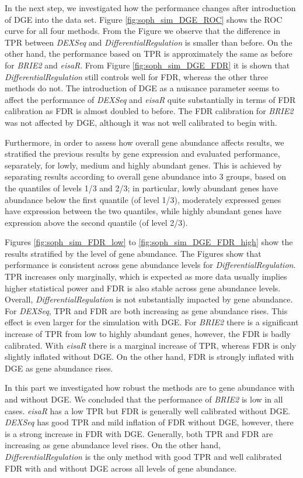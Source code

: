 In the next step, we investigated how the performance changes after introduction of DGE into the data set. Figure \ref{fig:soph_sim_DGE_ROC} shows the ROC curve for all four methods. From the Figure we observe that the difference in TPR between \emph{DEXSeq} and \emph{DifferentialRegulation} is smaller than before. On the other hand, the performance based on TPR is approximately the same as before for \emph{BRIE2} and \emph{eisaR}. From Figure \ref{fig:soph_sim_DGE_FDR} it is shown that \emph{DifferentialRegulation} still controls well for FDR, whereas the other three methods do not. The introduction of DGE as a nuisance parameter seems to affect the performance of \emph{DEXSeq} and \emph{eisaR} quite substantially in terms of FDR calibration as FDR is almost doubled to before. The FDR calibration for \emph{BRIE2} was not affected by DGE, although it was not well calibrated to begin with.

Furthermore, in order to assess how overall gene abundance affects results, we stratified the previous results by gene expression and evaluated performance, separately, for lowly, medium and highly abundant genes. This is achieved by separating results according to overall gene abundance into 3 groups, based on the quantiles of levels 1/3 and 2/3; in particular, lowly abundant genes have abundance below the first quantile (of level 1/3), moderately expressed genes have expression between the two quantiles, while highly abundant genes have expression above the second quantile (of level 2/3).

Figures \ref{fig:soph_sim_FDR_low} to \ref{fig:soph_sim_DGE_FDR_high} show the results stratified by the level of gene abundance. The Figures show that performance is consistent across gene abundance levels for \emph{DifferentialRegulation}. TPR increases only marginally, which is expected as more data usually implies higher statistical power and FDR is also stable across gene abundance levels. Overall, \emph{DifferentialRegulation} is not substantially impacted by gene abundance. For \emph{DEXSeq}, TPR and FDR are both increasing as gene abundance rises. This effect is even larger for the simulation with DGE. For \emph{BRIE2} there is a significant increase of TPR from low to highly abundant genes, however, the FDR is badly calibrated. With \emph{eisaR} there is a marginal increase of TPR, whereas FDR is only slightly inflated without DGE. On the other hand, FDR is strongly inflated with DGE as gene abundance rises.

In this part we investigated how robust the methods are to gene abundance with and without DGE. We concluded that the performance of \emph{BRIE2} is low in all cases. \emph{eisaR} has a low TPR but FDR is generally well calibrated without DGE. \emph{DEXSeq} has good TPR and mild inflation of FDR without DGE, however, there is a strong increase in FDR with DGE. Generally, both TPR and FDR are increasing as gene abundance level rises. On the other hand, \emph{DifferentialRegulation} is the only method with good TPR and well calibrated FDR with and without DGE across all levels of gene abundance.

